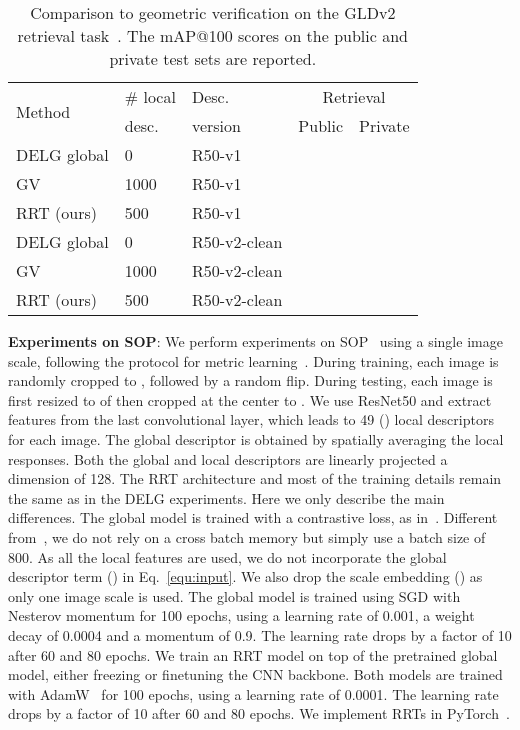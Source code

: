 \begin{table}[t]
\scalebox{0.95} {
\centering
    \begin{tabular}{l l l c c}
    \toprule
    \multirow{2}{*}{Method} & \# local &Desc. & \multicolumn{2}{c}{\small Retrieval}\\
    &desc.&version &Public& Private\\
    \midrule
    DELG global  &0 &R50-v1&  & \\
    GV &1000&R50-v1&  &  \\
    RRT (ours)  &500&R50-v1&  &  \\
    \midrule
    DELG global  &0&R50-v2-clean&  &  \\
    GV &1000&R50-v2-clean&  &  \\
    RRT (ours)  &500&R50-v2-clean&  &  \\
    \bottomrule
    \end{tabular}
}
\vspace{-0.05in}
\caption{Comparison to geometric verification on the GLDv2 retrieval task~\cite{revisited}. The mAP@100 scores on the public and private test sets are reported.
\vspace{-0.15in}
}
\label{tab:gldv2}
\end{table}

\textbf{Experiments on SOP}:
We perform experiments on SOP~\cite{sop2016} using a single image scale, following the protocol for metric learning~\cite{XBM2020}.
During training, each image is randomly cropped to , followed by a random flip.
During testing,  each image is first resized to of  then cropped at the center to .
We use ResNet50 and extract features from the last convolutional layer, which leads to 49 () local descriptors for each image.
The global descriptor is obtained by spatially averaging the local responses.
Both the global and local descriptors are linearly projected a dimension of 128. 
The RRT architecture and most of the training details remain the same as in the DELG experiments.
Here we only describe the main differences.
The global model is trained with a contrastive loss, as in~\cite{XBM2020}. 
Different from~\cite{XBM2020}, we do not rely on a cross batch memory but simply use a batch size of 800.
As all the local features are used, we do not incorporate the global descriptor term () in Eq.~\ref{equ:input}.
We also drop the scale embedding () as only one image scale is used.
The global model is trained using SGD with Nesterov momentum for 100 epochs, using a learning rate of 0.001, a weight decay of 0.0004 and a momentum of 0.9. 
The learning rate drops by a factor of 10 after 60 and 80 epochs.
We train an RRT model on top of the pretrained global model, either freezing or finetuning the CNN backbone.
Both models are trained with AdamW~\cite{adamw2019} for 100 epochs, using a learning rate of 0.0001. 
The learning rate drops by a factor of 10 after 60 and 80 epochs. 
We implement RRTs in PyTorch~\cite{pytorch2019}. 


